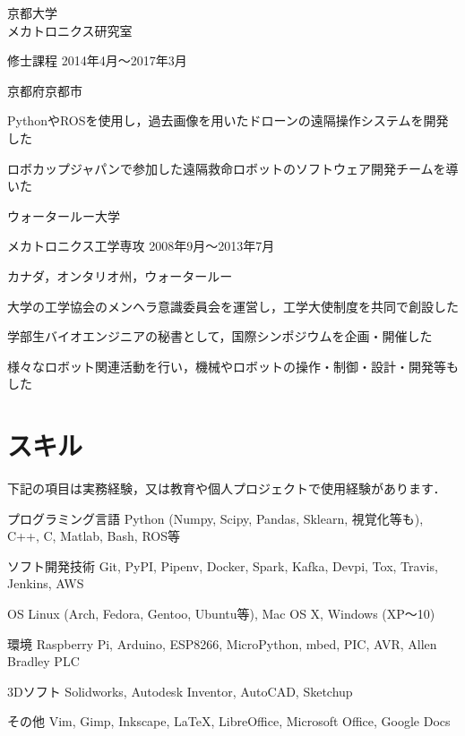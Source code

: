 \documentclass[10pt, a4paper]{article}
\begin{document}
\begin{outerlist}
\item[{\parbox[t]{3cm}{\raggedleft 京都大学\\メカトロニクス研究室}}]{修士課程} \hfill {2014年4月〜2017年3月}

\vspace{-\baselineskip}
\hfill 京都府京都市
  \begin{innerlist}
  \item PythonやROSを使用し，過去画像を用いたドローンの遠隔操作システムを開発した
  \item ロボカップジャパンで参加した遠隔救命ロボットのソフトウェア開発チームを導いた
  \end{innerlist}

\item[{\parbox[t]{3cm}{\raggedleft ウォータールー大学}}]{メカトロニクス工学専攻} \hfill {2008年9月〜2013年7月}

\hfill カナダ，オンタリオ州，ウォータールー
  \begin{innerlist}
  \item 大学の工学協会のメンヘラ意識委員会を運営し，工学大使制度を共同で創設した
  \item 学部生バイオエンジニアの秘書として，国際シンポジウムを企画・開催した
  \item 様々なロボット関連活動を行い，機械やロボットの操作・制御・設計・開発等もした
  \end{innerlist}

\end{outerlist}

\section{スキル}
下記の項目は実務経験，又は教育や個人プロジェクトで使用経験があります．
\begin{outerlist}
\item[プログラミング言語] Python (Numpy, Scipy, Pandas, Sklearn, 視覚化等も), C++, C, Matlab, Bash, ROS等
\item[ソフト開発技術] Git, PyPI, Pipenv, Docker, Spark, Kafka, Devpi, Tox, Travis, Jenkins, AWS
\item[OS] Linux (Arch, Fedora, Gentoo, Ubuntu等), Mac OS X, Windows (XP〜10)
\item[環境] Raspberry Pi, Arduino, ESP8266, MicroPython, mbed, PIC, AVR, Allen Bradley PLC
\item[3Dソフト] Solidworks, Autodesk Inventor, AutoCAD, Sketchup
\item[その他] Vim, Gimp, Inkscape, \LaTeX, LibreOffice, Microsoft Office, Google Docs
\end{outerlist}
\end{document}
